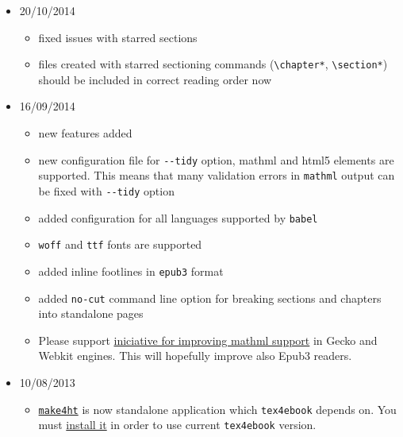 \begin{itemize}
  \begin{itemize}
  \item
    added new command \texttt{\textbackslash{}OpfGuide}, for adding
    items to \texttt{\textless{}guide\textgreater{}} section in the
    \texttt{opf} file. This is useful for \texttt{epub} and
    \texttt{mobi} formats.

    Usage:

\begin{verbatim}
    \OpfGuide[filename]{title}{reference type}
\end{verbatim}
  \end{itemize}

  \texttt{filename} is optional, current file name is used when empty.
  See
  \href{http://epubsecrets.com/where-do-you-start-an-epub-and-what-is-the-guide-section-of-the-opf-file.php}{epub
  secrets} article
\item
  20/10/2014

  \begin{itemize}
  \item
    fixed issues with starred sections
  \item
    files created with starred sectioning commands
    (\texttt{\textbackslash{}chapter*},
    \texttt{\textbackslash{}section*}) should be included in correct
    reading order now
  \end{itemize}
\item
  16/09/2014

  \begin{itemize}
  \tightlist
  \item
    new features added
  \item
    new configuration file for \texttt{-\/-tidy} option, mathml and
    html5 elements are supported. This means that many validation errors
    in \texttt{mathml} output can be fixed with \texttt{-\/-tidy} option
  \item
    added configuration for all languages supported by \texttt{babel}
  \item
    \texttt{woff} and \texttt{ttf} fonts are supported
  \item
    added inline footlines in \texttt{epub3} format
  \item
    added \texttt{no-cut} command line option for breaking sections and
    chapters into standalone pages
  \item
    Please support
    \href{http://www.ulule.com/mathematics-ebooks/}{iniciative for
    improving mathml support} in Gecko and Webkit engines. This will
    hopefully improve also Epub3 readers.
  \end{itemize}
\item
  10/08/2013

  \begin{itemize}
  \tightlist
  \item
    \href{https://github.com/michal-h21/make4ht}{\texttt{make4ht}} is
    now standalone application which \texttt{tex4ebook} depends on. You
    must
    \href{https://github.com/michal-h21/make4ht\#instalation}{install
    it} in order to use current \texttt{tex4ebook} version.
  \end{itemize}
\end{itemize}
